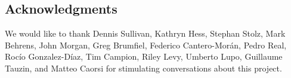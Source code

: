 
\subsection*{Acknowledgments} We would like to thank Dennis Sullivan, Kathryn Hess, Stephan Stolz, Mark Behrens, John Morgan, Greg Brumfiel, Federico Cantero-Mor\'an, Pedro Real, Roc\'io Gonzalez-D\'iaz, Tim Campion, Riley Levy, Umberto Lupo, Guillaume Tauzin, and Matteo Caorsi for stimulating conversations about this project.